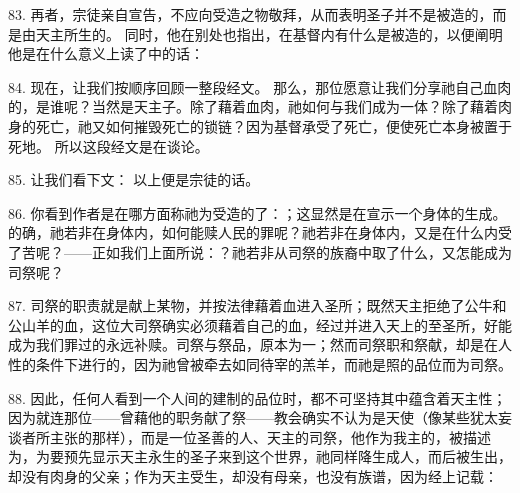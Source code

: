 83. 再者，宗徒亲自宣告，不应向受造之物敬拜，从而表明圣子并不是被造的，而是由天主所生的。 同时，他在别处也指出，在基督内有什么是被造的，以便阐明他是在什么意义上读了中的话：\par

84. 现在，让我们按顺序回顾一整段经文。  那么，那位愿意让我们分享祂自己血肉的，是谁呢？当然是天主子。除了藉着血肉，祂如何与我们成为一体？除了藉着肉身的死亡，祂又如何摧毁死亡的锁链？因为基督承受了死亡，便使死亡本身被置于死地。 所以这段经文是在谈论。\par

85. 让我们看下文： 以上便是宗徒的话。\par

86. 你看到作者是在哪方面称祂为受造的了：；这显然是在宣示一个身体的生成。的确，祂若非在身体内，如何能赎人民的罪呢？祂若非在身体内，又是在什么内受了苦呢？——正如我们上面所说：？祂若非从司祭的族裔中取了什么，又怎能成为司祭呢？\par

87. 司祭的职责就是献上某物，并按法律藉着血进入圣所；既然天主拒绝了公牛和公山羊的血，这位大司祭确实必须藉着自己的血，经过并进入天上的至圣所，好能成为我们罪过的永远补赎。司祭与祭品，原本为一；然而司祭职和祭献，却是在人性的条件下进行的，因为祂曾被牵去如同待宰的羔羊，而祂是照的品位而为司祭。\par

88. 因此，任何人看到一个人间的建制的品位时，都不可坚持其中蕴含着天主性；因为就连那位——曾藉他的职务献了祭——教会确实不认为是天使（像某些犹太妄谈者所主张的那样），而是一位圣善的人、天主的司祭，他作为我主的，被描述为，为要预先显示天主永生的圣子来到这个世界，祂同样降生成人，而后被生出，却没有肉身的父亲；作为天主受生，却没有母亲，也没有族谱，因为经上记载： \par

